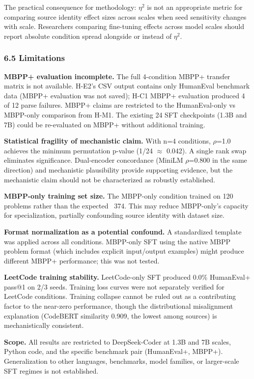 The practical consequence for methodology: $\eta^2$ is not an appropriate metric for comparing source identity effect sizes across scales when seed sensitivity changes with scale. Researchers comparing fine-tuning effects across model scales should report absolute condition spread alongside or instead of $\eta^2$.

\subsubsection{6.5 Limitations}

\textbf{MBPP+ evaluation incomplete.} The full 4-condition MBPP+ transfer matrix is not available. H-E2's CSV output contains only HumanEval benchmark data (MBPP+ evaluation was not saved); H-C1 MBPP+ evaluation produced 4 of 12 parse failures. MBPP+ claims are restricted to the HumanEval-only vs MBPP-only comparison from H-M1. The existing 24 SFT checkpoints (1.3B and 7B) could be re-evaluated on MBPP+ without additional training.

\textbf{Statistical fragility of mechanistic claim.} With n=4 conditions, $\rho$=1.0 achieves the minimum permutation p-value (1/24 $\approx$ 0.042). A single rank swap eliminates significance. Dual-encoder concordance (MiniLM $\rho$=0.800 in the same direction) and mechanistic plausibility provide supporting evidence, but the mechanistic claim should not be characterized as robustly established.

\textbf{MBPP-only training set size.} The MBPP-only condition trained on 120 problems rather than the expected ~374. This may reduce MBPP-only's capacity for specialization, partially confounding source identity with dataset size.

\textbf{Format normalization as a potential confound.} A standardized template was applied across all conditions. MBPP-only SFT using the native MBPP problem format (which includes explicit input/output examples) might produce different MBPP+ performance; this was not tested.

\textbf{LeetCode training stability.} LeetCode-only SFT produced 0.0\% HumanEval+ pass@1 on 2/3 seeds. Training loss curves were not separately verified for LeetCode conditions. Training collapse cannot be ruled out as a contributing factor to the near-zero performance, though the distributional misalignment explanation (CodeBERT similarity 0.909, the lowest among sources) is mechanistically consistent.

\textbf{Scope.} All results are restricted to DeepSeek-Coder at 1.3B and 7B scales, Python code, and the specific benchmark pair (HumanEval+, MBPP+). Generalization to other languages, benchmarks, model families, or larger-scale SFT regimes is not established.

